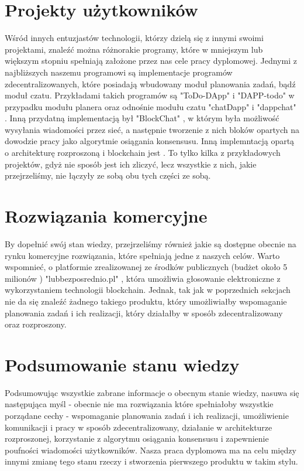 \section{Projekty użytkowników}
\label{sec:ProjektyUzytkownikow}
Wśród innych entuzjastów technologii, którzy dzielą się z innymi swoimi projektami, znaleźć można różnorakie programy, które w mniejszym lub większym stopniu spełniają założone przez nas cele pracy dyplomowej. Jednymi z najbliższych naszemu programowi są implementacje programów zdecentralizowanych, które posiadają wbudowany moduł planowania zadań, bądź moduł czatu. Przykładami takich programów są "ToDo-DApp" \cite{ToDo_DApp} i "DAPP-todo" \cite{DAPP_todo} w przypadku modułu planera oraz odnośnie modułu czatu "chatDapp" \cite{chatDapp} i "dappchat" \cite{dappchat}. Inną przydatną implementacją był "BlockChat" \cite{blockchat}, w którym była możliwość wysyłania wiadomości przez sieć, a następnie tworzenie z nich bloków opartych na dowodzie pracy jako algorytmie osiągania konsensusu. Inną implemntacją opartą o architekturę rozproszoną i blockchain jest \cite{PythonBlockchain}. To tylko kilka z przykładowych projektów, gdyż nie sposób jest ich zliczyć, lecz wszystkie z nich, jakie przejrzeliśmy, nie łączyły ze sobą obu tych części ze sobą.%

\section{Rozwiązania komercyjne}
\label{sec:RozwiazaniaKomercyjne}
By dopełnić swój stan wiedzy, przejrzeliśmy również jakie są dostępne obecnie na rynku komercyjne rozwiązania, które spełniają jedne z naszych celów. Warto wspomnieć, o platformie zrealizowanej ze środków publicznych (budżet około 5 milionów \cite{IDB})  "lubbezposrednio.pl" \cite{lubBezPosrednio}, która umożliwia głosowanie elektroniczne z wykorzystaniem technologii blockchain. Jednak, tak jak w poprzednich sekcjach nie da się znaleźć żadnego takiego produktu, który umożliwiałby wspomaganie planowania zadań i ich realizacji, który działałby w sposób zdecentralizowany oraz rozproszony. %

\section{Podsumowanie stanu wiedzy}
\label{sec:PodsumowanieWiedzy}
Podsumowując wszystkie zabrane informacje o obecnym stanie wiedzy, nasuwa się następująca myśl - obecnie nie ma rozwiązania które spełniałoby wszystkie porządane cechy - wspomaganie planowania zadań i ich realizacji, umożliwienie komunikacji i pracy w sposób zdecentralizowany, działanie w architekturze rozproszonej, korzystanie z algorytmu osiągania konsensusu i zapewnienie poufności wiadomości użytkowników. Nasza praca dyplomowa ma na celu między innymi zmianę tego stanu rzeczy i stworzenia pierwszego produktu w takim stylu.